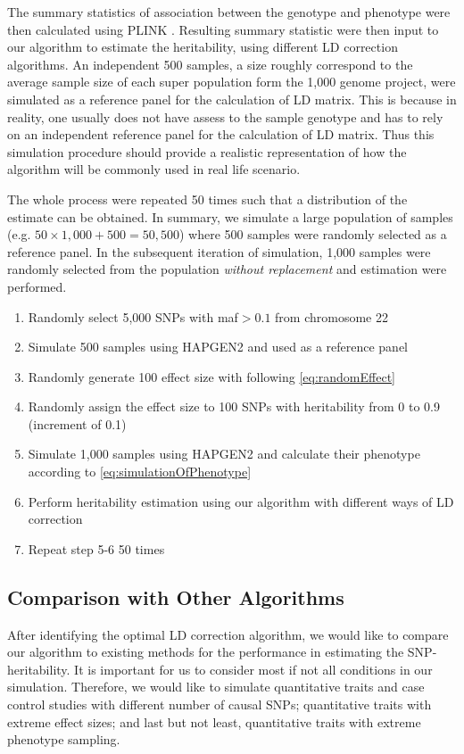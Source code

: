 		The summary statistics of association between the genotype and phenotype were then calculated using PLINK \citep{Purcell2007}.
		Resulting summary statistic were then input to our algorithm to estimate the heritability, using different \gls{LD} correction algorithms.
		An independent 500 samples, a size roughly correspond to the average sample size of each super population form the 1,000 genome project,  were simulated as a reference panel for the calculation of \gls{LD} matrix.
		This is because in reality, one usually does not have assess to the sample genotype and has to rely on an independent reference panel for the calculation of \gls{LD} matrix. 
		Thus this simulation procedure should provide a realistic representation of how the algorithm will be commonly used in real life scenario.
		
		The whole process were repeated 50 times such that a distribution of the estimate can be obtained. 
		In summary, we simulate a large population of samples (e.g. $50\times1,000+500 = 50,500$) where 500 samples were randomly selected as a reference panel. 
		In the subsequent iteration of simulation, 1,000 samples were randomly selected from the population \textit{without replacement} and estimation were performed.
		\begin{enumerate}
			\item Randomly select 5,000 \glspl{SNP} with \gls{maf}$>0.1$ from chromosome 22
			\item Simulate 500 samples using HAPGEN2 and used as a reference panel
			\item Randomly generate 100 effect size with following \cref{eq:randomEffect}
			\item Randomly assign the effect size to 100 \glspl{SNP} with heritability from 0 to 0.9 (increment of 0.1)
			\item Simulate 1,000 samples using HAPGEN2 and calculate their phenotype according to \cref{eq:simulationOfPhenotype} 
			\item Perform heritability estimation using our algorithm with different ways of \gls{LD} correction
			\item Repeat step 5-6 50 times
		\end{enumerate}
		
		\subsection{Comparison with Other Algorithms}
		After identifying the optimal \gls{LD} correction algorithm, we would like to compare our algorithm to existing methods for the performance in estimating the \gls{SNP}-heritability.
		It is important for us to consider most if not all conditions in our simulation. 
		Therefore, we would like to simulate quantitative traits and case control studies with different number of causal \glspl{SNP}; quantitative traits with extreme effect sizes; and last but not least, quantitative traits with extreme phenotype sampling.
		
